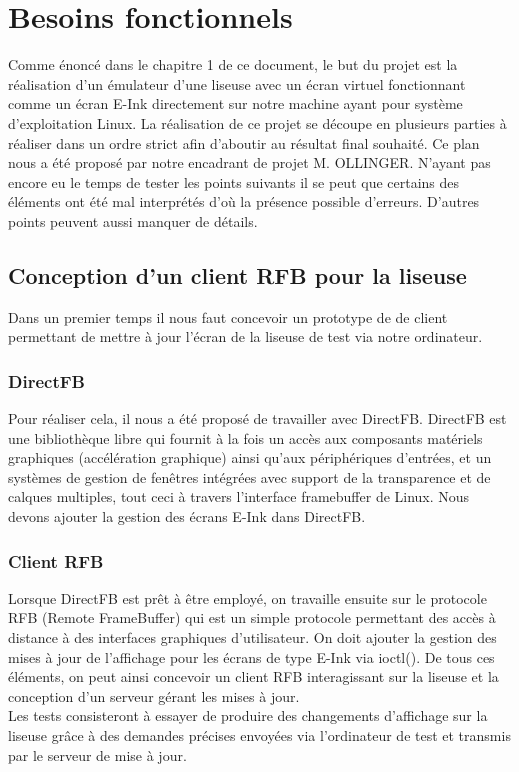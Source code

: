 \chapter{Besoins fonctionnels}

Comme énoncé dans le chapitre 1 de ce document, le but du projet est la réalisation d'un émulateur d'une liseuse avec un écran virtuel fonctionnant comme un écran E-Ink directement sur notre machine ayant pour système d'exploitation Linux. La réalisation de ce projet se découpe en plusieurs parties à réaliser dans un ordre strict afin d'aboutir au résultat final souhaité. Ce plan nous a été proposé par notre encadrant de projet M. OLLINGER. N'ayant pas encore eu le temps de tester les points suivants il se peut que certains des éléments ont été mal interprétés d'où la présence possible d'erreurs. D'autres points peuvent aussi manquer de détails.

\section{Conception d'un client RFB pour la liseuse}

Dans un premier temps il nous faut concevoir un prototype de de client permettant de mettre à jour l'écran de la liseuse de test via notre ordinateur.

\subsection{DirectFB}
Pour réaliser cela, il nous a été proposé de travailler avec DirectFB. DirectFB est une bibliothèque libre qui fournit à la fois un accès aux composants matériels graphiques (accélération graphique) ainsi qu'aux périphériques d'entrées, et un systèmes de gestion de fenêtres intégrées avec support de la transparence et de calques multiples, tout ceci à travers l'interface framebuffer de Linux. Nous devons ajouter la gestion des écrans E-Ink dans DirectFB. 
 
\subsection{Client RFB}
Lorsque DirectFB est prêt à être employé, on travaille ensuite sur le protocole RFB (Remote FrameBuffer) qui est un simple protocole permettant des accès à distance à des interfaces graphiques d'utilisateur. On doit ajouter la gestion des mises à jour de l'affichage pour les écrans de type E-Ink via ioctl(). De tous ces éléments, on peut ainsi concevoir un client RFB interagissant sur la liseuse et la conception d'un serveur gérant les mises à jour.
\\Les tests consisteront à essayer de produire des changements d'affichage sur la liseuse grâce à des demandes précises envoyées via l'ordinateur de test et transmis par le serveur de mise à jour. 

